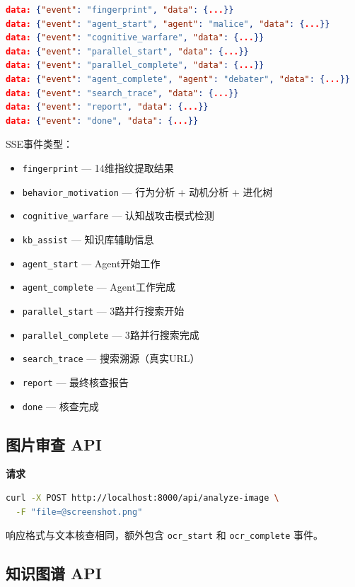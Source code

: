 \documentclass[12pt,a4paper]{ctexart}
\begin{document}
\begin{lstlisting}[language=json]
data: {"event": "fingerprint", "data": {...}}
data: {"event": "agent_start", "agent": "malice", "data": {...}}
data: {"event": "cognitive_warfare", "data": {...}}
data: {"event": "parallel_start", "data": {...}}
data: {"event": "parallel_complete", "data": {...}}
data: {"event": "agent_complete", "agent": "debater", "data": {...}}
data: {"event": "search_trace", "data": {...}}
data: {"event": "report", "data": {...}}
data: {"event": "done", "data": {...}}
\end{lstlisting}

SSE事件类型：

\begin{itemize}[leftmargin=*]
    \item \texttt{fingerprint} — 14维指纹提取结果
    \item \texttt{behavior\_motivation} — 行为分析 + 动机分析 + 进化树
    \item \texttt{cognitive\_warfare} — 认知战攻击模式检测
    \item \texttt{kb\_assist} — 知识库辅助信息
    \item \texttt{agent\_start} — Agent开始工作
    \item \texttt{agent\_complete} — Agent工作完成
    \item \texttt{parallel\_start} — 3路并行搜索开始
    \item \texttt{parallel\_complete} — 3路并行搜索完成
    \item \texttt{search\_trace} — 搜索溯源（真实URL）
    \item \texttt{report} — 最终核查报告
    \item \texttt{done} — 核查完成
\end{itemize}

\subsection{图片审查 API}

\textbf{请求}
\begin{lstlisting}[language=bash]
curl -X POST http://localhost:8000/api/analyze-image \
  -F "file=@screenshot.png"
\end{lstlisting}

响应格式与文本核查相同，额外包含 \texttt{ocr\_start} 和 \texttt{ocr\_complete} 事件。

\subsection{知识图谱 API}
\end{document}
